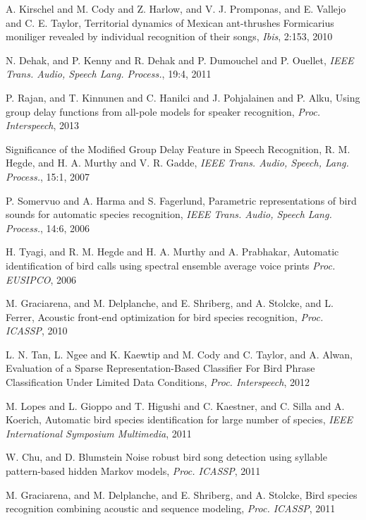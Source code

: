\documentclass{article}
\begin{document}
\begin{thebibliography}{100}
A. Kirschel and M. Cody and Z. Harlow, and V. J. Promponas,
and E. Vallejo and C. E. Taylor,
Territorial dynamics of Mexican ant-thrushes Formicarius moniliger revealed by
individual recognition of their songs, \emph{Ibis}, 2:153, 2010

N. Dehak, and P. Kenny and R. Dehak and P. Dumouchel and P. Ouellet,
\emph{IEEE Trans. Audio, Speech Lang. Process.}, 19:4, 2011

P. Rajan, and T. Kinnunen and C. Hanilci and J. Pohjalainen and P. Alku, 
Using group delay functions from all-pole models for speaker recognition,
\emph{Proc. Interspeech}, 2013

Significance of the Modified Group Delay Feature in Speech Recognition,
R. M. Hegde, and H. A. Murthy and V. R. Gadde,
\emph{IEEE Trans. Audio, Speech, Lang. Process.},
15:1, 2007

P. Somervuo and A. Harma and S. Fagerlund,
Parametric representations of bird sounds for automatic species recognition,
\emph{IEEE Trans. Audio, Speech Lang. Process.}, 14:6, 2006


H. Tyagi, and R. M. Hegde and H. A. Murthy and A. Prabhakar,
Automatic identification of bird calls using spectral ensemble average voice prints
\emph{Proc. EUSIPCO}, 2006

M. Graciarena, and M. Delplanche, and E. Shriberg, and A. Stolcke, and L. Ferrer, 
Acoustic front-end optimization for bird species recognition,
\emph{Proc. ICASSP}, 2010

L. N. Tan, L. Ngee and K. Kaewtip and M. Cody and C. Taylor, and A. Alwan,
Evaluation of a Sparse Representation-Based Classifier For Bird Phrase
Classification Under Limited Data Conditions,
\emph{Proc. Interspeech}, 2012

M. Lopes and L. Gioppo and T. Higushi and C. Kaestner, and C. Silla 
and A. Koerich, 
Automatic bird species identification for large number of species,
\emph{IEEE International Symposium Multimedia}, 2011

W. Chu, and D. Blumstein
Noise robust bird song detection using syllable pattern-based hidden {M}arkov
models,
\emph{Proc. ICASSP}, 2011

M. Graciarena, and M. Delplanche, and E. Shriberg, and A. Stolcke,
Bird species recognition combining acoustic and sequence modeling,
\emph{Proc. ICASSP}, 2011


\end{thebibliography}
\end{document}
